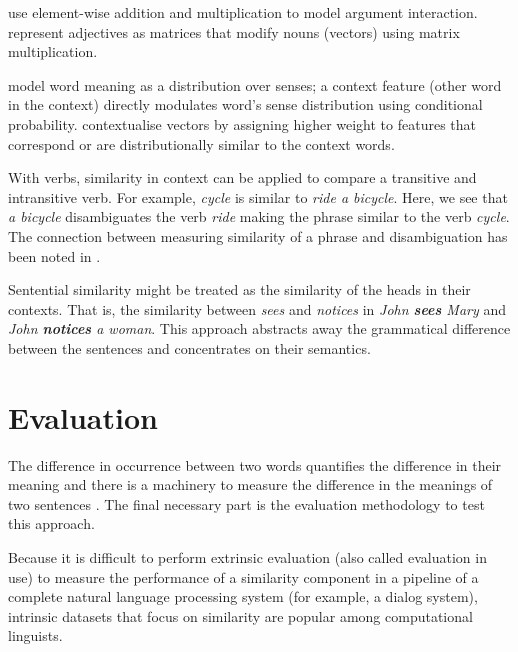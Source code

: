  use element-wise addition and multiplication to model argument interaction.  represent adjectives as matrices that modify nouns (vectors) using matrix multiplication.

 model word meaning as a distribution over senses; a context feature (other word in the context)  directly modulates word’s sense distribution using conditional probability.  contextualise vectors by assigning higher weight to features that correspond or are distributionally similar to the context words.


With verbs, similarity in context can be applied to compare a transitive and intransitive verb. For example, \textit{cycle} is similar to \textit{ride a bicycle}. Here, we see that \textit{a bicycle} disambiguates the verb \textit{ride} making the phrase similar to the verb \textit{cycle}. The connection between measuring similarity of a phrase and disambiguation has been noted in .


Sentential similarity might be treated as the similarity of the heads in their contexts. That is, the similarity between \textit{sees} and \textit{notices} in \textit{John \textbf{sees} Mary} and \textit{John \textbf{notices} a woman}. This approach abstracts away the grammatical difference between the sentences and concentrates on their semantics.

\section{Evaluation}
\label{sec:intrinsic-evaluation}

The difference in occurrence between two words quantifies the difference in their meaning \cite{harris1954distributional} and there is a machinery to measure the difference in the meanings of two sentences \cite{DBLP:journals/corr/abs-1003-4394}. The final necessary part is the evaluation methodology to test this approach.

Because it is difficult to perform extrinsic evaluation (also called evaluation in use) to measure the performance of a similarity component in a pipeline of a complete natural language processing system (for example, a dialog system), intrinsic datasets that focus on similarity are popular among computational linguists.

